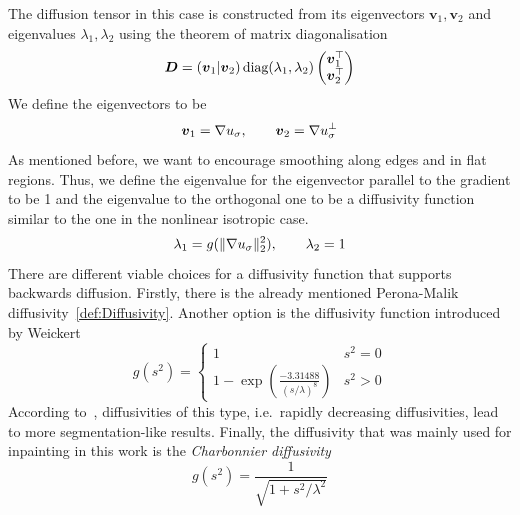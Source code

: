 The diffusion tensor in this case is constructed from its eigenvectors $\boldsymbol v_1,
\boldsymbol v_2$ and eigenvalues $\lambda_1, \lambda_2$ using the
theorem of matrix diagonalisation
\begin{equation}\label{eq:DiffTensor}
    \boldsymbol D = \left(\boldsymbol v_1\vert \boldsymbol v_2\right) \textnormal{diag}(\lambda_1, \lambda_2)
    \begin{pmatrix}
        \boldsymbol v_1^\top\\
        \boldsymbol v_2^\top
    \end{pmatrix}
\end{equation}
We define the eigenvectors to be
\begin{equation}
    \boldsymbol v_1 = \mathbf{\nabla} u_\sigma,\qquad\boldsymbol v_2 = \mathbf{\nabla} u_\sigma^\bot
\end{equation}
As mentioned before, we want to encourage smoothing along edges and in flat regions. Thus, we
define the eigenvalue for the eigenvector parallel to the gradient to be 1 and the eigenvalue to
the orthogonal one to be a diffusivity function similar to the one in the nonlinear isotropic case.
\begin{equation}
    \lambda_1 = g(\lVert\mathbf{\nabla} u_\sigma\rVert_2^2),\qquad\lambda_2 = 1
\end{equation}
There are different viable choices for a diffusivity function that supports backwards diffusion.
Firstly, there is the already mentioned Perona-Malik diffusivity~\eqref{def:Diffusivity}. Another
option is the diffusivity function introduced by Weickert\cite{weickert96}
\begin{equation}
    g(s^2) = \begin{cases}
        1 & s^2 = 0\\
        1 - \exp\left(\frac{-3.31488}{{(s/\lambda)}^8}\right) & s^2 > 0
    \end{cases}\label{def:WeickertDiff}
\end{equation}
According to~\cite{dic}, diffusivities of this type, i.e.\ rapidly decreasing diffusivities,
lead to more segmentation-like results.
Finally, the diffusivity that was mainly used for inpainting in this work is the
\textit{Charbonnier diffusivity}~\cite{charbonnier}
\begin{equation}
    g(s^2) = \frac{1}{\sqrt{1 + s^2 / \lambda^2}}\label{def:CharbonnierDiff}
\end{equation}
